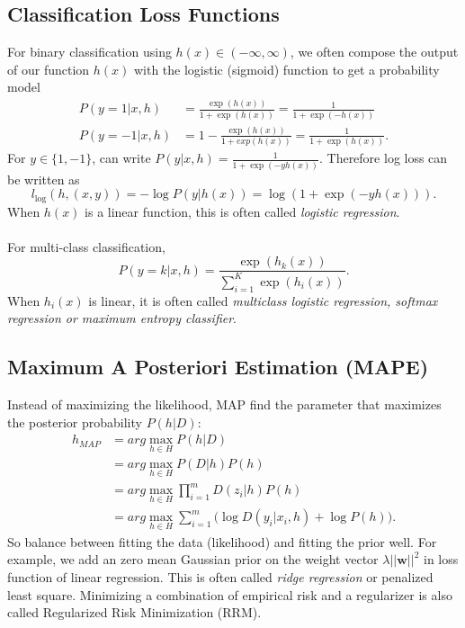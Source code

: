 \documentclass{article}
\begin{document}
    \subsection{Classification Loss Functions}
    For binary classification using $h(x) \in (-\infty , \infty)$, we often compose the output of our function $h(x)$ with the logistic (sigmoid) function to get a probability model 
    \begin{align}
    P(y=1|x,h) &= \frac{\exp(h(x))}{1 + \exp(h(x))} = \frac{1}{1+\exp(-h(x))} \\
    P(y=-1|x,h) &= 1-\frac{\exp(h(x))}{1 + exp(h(x))} = \frac{1}{1 + \exp(h(x))}.
    \end{align}
    For $y \in \{1,-1\}$, can write $P(y|x,h) = \frac{1}{1+\exp(-yh(x))}.$ Therefore log loss can be written as
    \begin{equation}
    l_{\log}(h,(x,y)) = -\log P(y|h(x)) = \log(1+\exp (-yh(x))).
    \end{equation}
    When $h(x)$ is a linear function, this is often called \textit{logistic regression}. \\\\
    For multi-class classification, 
    \begin{equation}
    P(y=k|x,h)=\frac{\exp(h_k(x))}{\sum_{i=1}^K \exp (h_i(x))}.
    \end{equation}
    When $h_i(x)$ is linear, it is often called \textit{multiclass logistic regression, softmax regression or maximum entropy classifier}.
    
    \subsection{Maximum A Posteriori Estimation (MAPE)}
    Instead of maximizing the likelihood, MAP find the parameter that maximizes the posterior probability $P(h|D)$:
    \begin{align}
    h_{MAP} &= arg \max_{h \in H} P(h|D) \\
    		&= arg \max_{h \in H} P(D|h)P(h) \\
            &= arg \max_{h \in H} \prod_{i=1}^m D(z_i|h)P(h) \\
            &= arg \max_{h \in H} \sum_{i=1}^m \Big( \log D(y_i|x_i, h) + \log P(h) \Big).
    \end{align}
    So balance between fitting the data (likelihood) and fitting the prior well. For example, we add an zero mean Gaussian prior on the weight vector $\lambda ||\textbf{w}||^2$ in loss function of linear regression. This is often called \textit{ridge regression} or penalized least square. Minimizing a combination of empirical risk and a regularizer is also called Regularized Risk Minimization (RRM).
    
\end{document}
